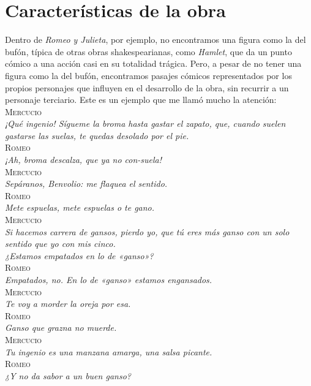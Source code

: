 \documentclass[12pt,a4paper]{article}
\begin{document}
\section{Características de la obra}

Dentro de \textit{Romeo y Julieta}, por ejemplo, no encontramos una figura como la del bufón, típica de otras obras shakespearianas, como \textit{Hamlet}, que da un punto cómico a una acción casi en su totalidad trágica. Pero, a pesar de no tener una figura como la del bufón, encontramos pasajes cómicos representados por los propios personajes que influyen en el desarrollo de la obra, sin recurrir a un personaje terciario. Este es un ejemplo que me llamó mucho la atención:\\

\noindent\textsc{Mercucio}\\
\indent\textit{¡Qué ingenio! Sígueme la broma hasta gastar el zapato, que, cuando suelen gastarse las suelas, te quedas desolado por el pie.}\\
\textsc{Romeo}\\
\indent\textit{¡Ah, broma descalza, que ya no con-suela!}\\
\textsc{Mercucio}\\
\indent\textit{Sepáranos, Benvolio: me flaquea el sentido.}\\
\textsc{Romeo}\\
\indent\textit{Mete espuelas, mete espuelas o te gano.}\\
\textsc{Mercucio}\\
\indent\textit{Si hacemos carrera de gansos, pierdo yo, que tú eres más ganso con un solo sentido que yo con mis cinco.}\\
\indent\textit{¿Estamos empatados en lo de «ganso»?}\\
\textsc{Romeo}\\
\indent\textit{Empatados, no. En lo de «ganso» estamos engansados.}\\
\textsc{Mercucio}\\
\indent\textit{Te voy a morder la oreja por esa.}\\
\textsc{Romeo}\\
\indent\textit{Ganso que grazna no muerde.}\\
\textsc{Mercucio}\\
\indent\textit{Tu ingenio es una manzana amarga, una salsa picante.}\\
\textsc{Romeo}\\
\indent\textit{¿Y no da sabor a un buen ganso?}\\
\end{document}
